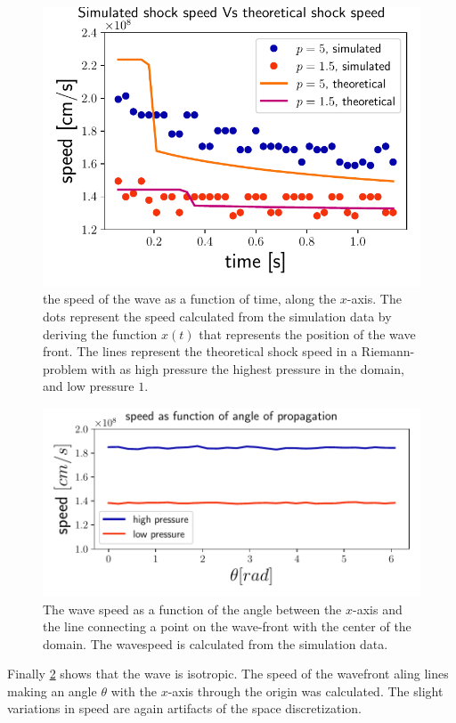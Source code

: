 \begin{figure}[H]
	\centering
	\includegraphics[width=\linewidth]{images/speed-time-hd.pdf}
	\caption{the speed of the wave as a function of time, along the $x$-axis. The dots represent the speed calculated from the simulation data by deriving the function $x(t)$ that represents the position of the wave front. The lines represent the theoretical shock speed in a Riemann-problem with as high pressure the highest pressure in the domain, and low pressure $1$.}
	\label{fig:speed-time-hd}
\end{figure}

\begin{figure}[H]
	\centering
	\includegraphics[width=\linewidth]{images/speed-angle-hd.pdf}
	\caption{The wave speed as a function of the angle between the $x$-axis and the line connecting a point on the wave-front with the center of the domain. The wavespeed is calculated from the simulation data.}
	\label{fig:speed-angle-hd}
\end{figure}

Finally \cref{fig:speed-angle-hd} shows that the wave is isotropic. 
The speed of the wavefront aling lines making an angle $\theta$ with the $x$-axis through the origin was calculated. 
The slight variations in speed are again artifacts of the space discretization.
